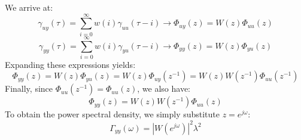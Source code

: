 We arrive at:
\[\gamma_{uy}(\tau)=\sum_{i=0}^{\infty}w(i)\gamma_{uu}(\tau-i)\rightarrow\Phi_{uy}(z)=W(z)\Phi_{uu}(z)\]
\[\gamma_{yy}(\tau)=\sum_{i=0}^{\infty}w(i)\gamma_{yu}(\tau-i)\rightarrow\Phi_{yy}(z)=W(z)\Phi_{yu}(z)\]
Expanding these expressions yields:
\[\Phi_{yy}(z)=W(z)\Phi_{yu}(z)=W(z)\Phi_{uy}(z^{-1})=W(z)W(z^{-1})\Phi_{uu}(z^{-1})\]
Finally, since $\Phi_{uu}(z^{-1})=\Phi_{uu}(z)$, we also have:
\[\Phi_{yy}(z)=W(z)W(z^{-1})\Phi_{uu}(z)\]
To obtain the power spectral density, we simply substitute $z = e^{j\omega}$:
\[\Gamma_{yy}(\omega)=\left\lvert W(e^{j\omega})\right\rvert^2\lambda^2 \]